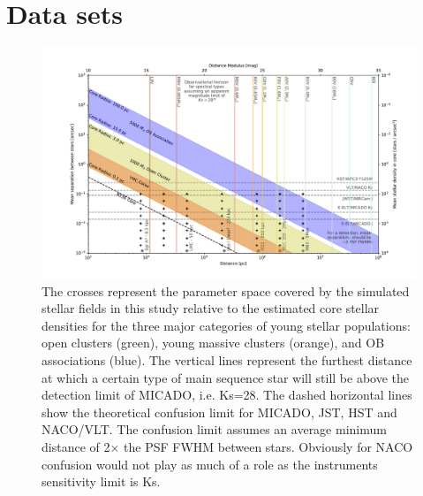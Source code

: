 \section{Data sets}
\label{sec:observations}


\begin{figure}

    \centering
    \includegraphics[width=\textwidth]{images/resolved_stellar_densities}

    \caption{The crosses represent the parameter space covered by the
    simulated stellar fields in this study relative to the estimated core
    stellar densities for the three major categories of young stellar
    populations: open clusters (green), young massive clusters (orange), and
    OB associations (blue). The vertical lines represent the furthest
    distance at which a certain type of main sequence star will still be
    above  the detection limit of MICADO, i.e. Ks=28\m. The dashed horizontal
    lines show the theoretical confusion limit for MICADO, JST, HST and
    NACO/VLT. The confusion limit assumes an average minimum distance of
    2$\times$ the PSF FWHM between stars. Obviously for NACO confusion
    would not play as much of a role as the instruments sensitivity limit is
    Ks\m.}
    
    \label{fig:resolved_stellar_densities}
    
\end{figure}


